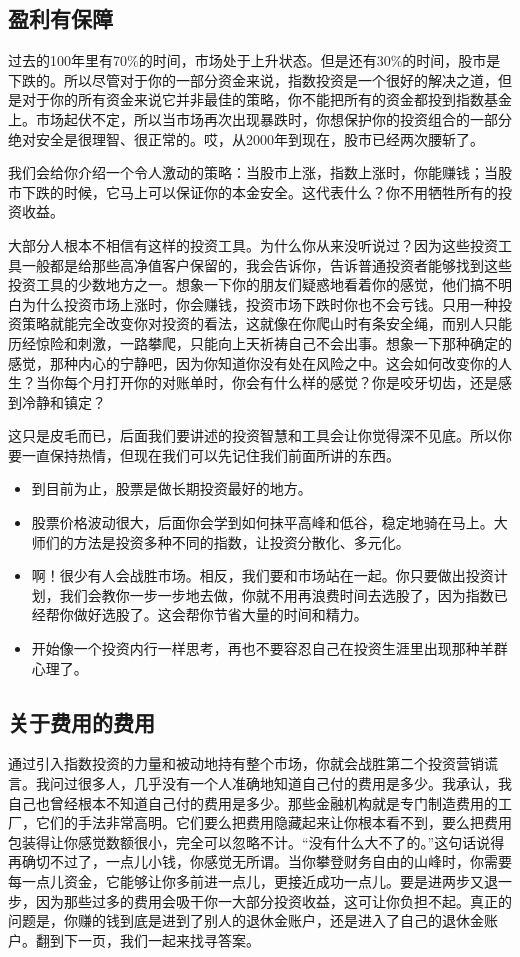 \subsection{盈利有保障}

过去的100年里有70\%的时间，市场处于上升状态。但是还有30\%的时间，股市是下跌的。所以尽管对于你的一部分资金来说，指数投资是一个很好的解决之道，但是对于你的所有资金来说它并非最佳的策略，你不能把所有的资金都投到指数基金上。市场起伏不定，所以当市场再次出现暴跌时，你想保护你的投资组合的一部分绝对安全是很理智、很正常的。哎，从2000年到现在，股市已经两次腰斩了。

我们会给你介绍一个令人激动的策略：当股市上涨，指数上涨时，你能赚钱；当股市下跌的时候，它马上可以保证你的本金安全。这代表什么？你不用牺牲所有的投资收益。

大部分人根本不相信有这样的投资工具。为什么你从来没听说过？因为这些投资工具一般都是给那些高净值客户保留的，我会告诉你，告诉普通投资者能够找到这些投资工具的少数地方之一。想象一下你的朋友们疑惑地看着你的感觉，他们搞不明白为什么投资市场上涨时，你会赚钱，投资市场下跌时你也不会亏钱。只用一种投资策略就能完全改变你对投资的看法，这就像在你爬山时有条安全绳，而别人只能历经惊险和刺激，一路攀爬，只能向上天祈祷自己不会出事。想象一下那种确定的感觉，那种内心的宁静吧，因为你知道你没有处在风险之中。这会如何改变你的人生？当你每个月打开你的对账单时，你会有什么样的感觉？你是咬牙切齿，还是感到冷静和镇定？

这只是皮毛而已，后面我们要讲述的投资智慧和工具会让你觉得深不见底。所以你要一直保持热情，但现在我们可以先记住我们前面所讲的东西。

\begin{itemize}
\item 到目前为止，股票是做长期投资最好的地方。
\item 股票价格波动很大，后面你会学到如何抹平高峰和低谷，稳定地骑在马上。大师们的方法是投资多种不同的指数，让投资分散化、多元化。
\item 啊！很少有人会战胜市场。相反，我们要和市场站在一起。你只要做出投资计划，我们会教你一步一步地去做，你就不用再浪费时间去选股了，因为指数已经帮你做好选股了。这会帮你节省大量的时间和精力。
\item 开始像一个投资内行一样思考，再也不要容忍自己在投资生涯里出现那种羊群心理了。
\end{itemize}

\subsection{关于费用的费用}

通过引入指数投资的力量和被动地持有整个市场，你就会战胜第二个投资营销谎言。我问过很多人，几乎没有一个人准确地知道自己付的费用是多少。我承认，我自己也曾经根本不知道自己付的费用是多少。那些金融机构就是专门制造费用的工厂，它们的手法非常高明。它们要么把费用隐藏起来让你根本看不到，要么把费用包装得让你感觉数额很小，完全可以忽略不计。“没有什么大不了的。”这句话说得再确切不过了，一点儿小钱，你感觉无所谓。当你攀登财务自由的山峰时，你需要每一点儿资金，它能够让你多前进一点儿，更接近成功一点儿。要是进两步又退一步，因为那些过多的费用会吸干你一大部分投资收益，这可让你负担不起。真正的问题是，你赚的钱到底是进到了别人的退休金账户，还是进入了自己的退休金账户。翻到下一页，我们一起来找寻答案。
